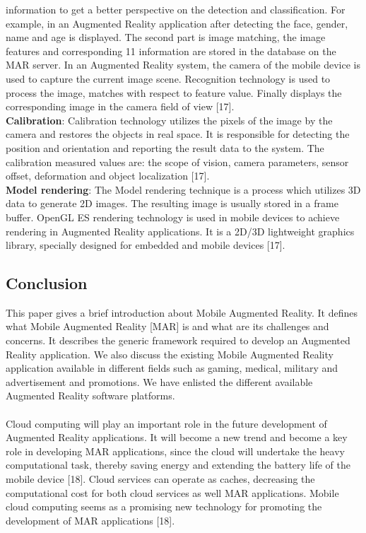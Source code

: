 information to get a better perspective on the detection and classification. For example, in 
an Augmented Reality application after detecting the face, gender, name and age is 
displayed. The second part is image matching, the image features and corresponding 
11 
information are stored in the database on the MAR server. In an Augmented Reality 
system, the camera of the mobile device is used to capture the current image scene. 
Recognition technology is used to process the image, matches with respect to feature 
value. Finally displays the corresponding image in the camera field of view [17].  
    \\\textbf{Calibration}: Calibration technology utilizes the pixels of the image by the camera 
and restores the objects in real space. It is responsible for detecting the position and 
orientation and reporting the result data to the system. The calibration measured values 
are: the scope of vision, camera parameters, sensor offset, deformation and object 
localization [17]. 
  \\\textbf{Model rendering}: The Model rendering technique is a process which utilizes 3D data 
to generate 2D images. The resulting image is usually stored in a frame buffer. OpenGL 
ES rendering technology is used in mobile devices to achieve rendering in Augmented 
Reality applications. It is a 2D/3D lightweight graphics library, specially designed for 
embedded and mobile devices [17].  
 \subsection{Conclusion}
 This paper gives a brief introduction about Mobile Augmented Reality. It defines what 
Mobile Augmented Reality [MAR] is and what are its challenges and concerns. It 
describes the generic framework required to develop an Augmented Reality application. 
We also discuss the existing Mobile Augmented Reality application available in different 
fields such as gaming, medical, military and advertisement and promotions. We have 
enlisted the different available Augmented Reality software platforms. 
  \paragraph{}  Cloud computing will play an important role in the future development of Augmented 
Reality applications. It will become a new trend and become a key role in developing 
MAR applications, since the cloud will undertake the heavy computational task, thereby 
saving energy and extending the battery life of the mobile device [18]. Cloud services can 
operate as caches, decreasing the computational cost for both cloud services as well MAR 
applications. Mobile cloud computing seems as a promising new technology for 
promoting the development of MAR applications [18].

